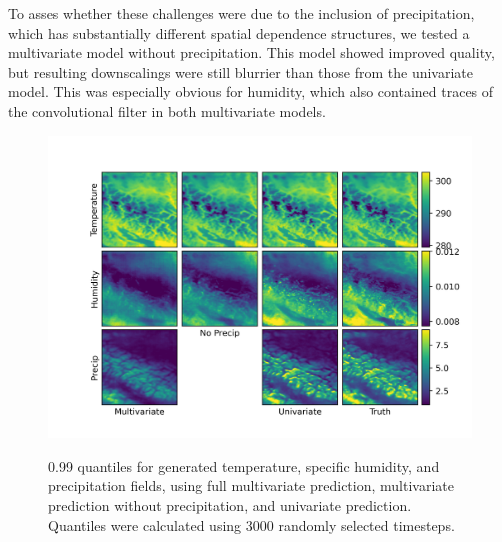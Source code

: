 \documentclass{ametsocV6.1}
\begin{document}
To asses whether these challenges were due to the inclusion of precipitation, which has substantially different spatial dependence structures, we tested a multivariate model without precipitation. This model showed improved quality, but resulting downscalings were still blurrier than those from the univariate model. This was especially obvious for humidity, which also contained traces of the convolutional filter in both multivariate models.  
\begin{figure}[H]
  \noindent\includegraphics[width=\textwidth,angle=0]{final/MV_UV_Quantiles.png}\\
  \caption{0.99 quantiles for generated temperature, specific humidity, and precipitation fields, using full multivariate prediction, multivariate prediction without precipitation, and univariate prediction. Quantiles were calculated using 3000 randomly selected timesteps. }\label{mv_quantiles}
\end{figure}
\end{document}
